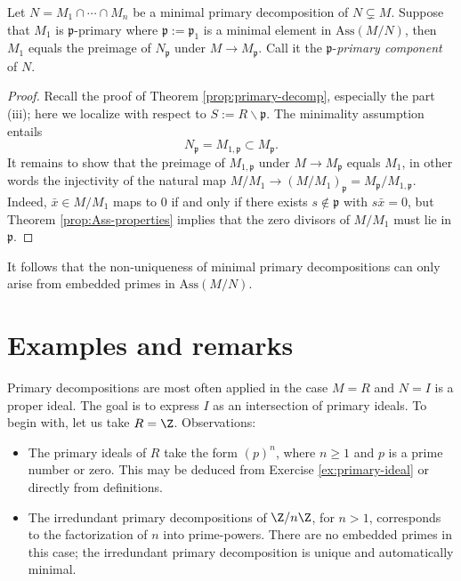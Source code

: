 \begin{corollary}\label{prop:p-primary-component}
	Let $N = M_1 \cap \cdots \cap M_n$ be a minimal primary decomposition of $N \subsetneq M$. Suppose that $M_1$ is $\mathfrak{p}$-primary where $\mathfrak{p} := \mathfrak{p}_1$ is a minimal element in $\mathrm{Ass}(M/N)$, then $M_1$ equals the preimage of $N_{\mathfrak{p}}$ under $M \to M_{\mathfrak{p}}$. Call it the $\mathfrak{p}$-\emph{primary component} of $N$.
\end{corollary}
\begin{proof}
	Recall the proof of Theorem \ref{prop:primary-decomp}, especially the part (iii); here we localize with respect to $S := R \smallsetminus \mathfrak{p}$. The minimality assumption entails
	\[ N_{\mathfrak{p}} = M_{1, \mathfrak{p}} \subset M_{\mathfrak{p}}. \]
	It remains to show that the preimage of $M_{1, \mathfrak{p}}$ under $M \to M_{\mathfrak{p}}$ equals $M_1$, in other words the injectivity of the natural map $M/M_1 \to (M/M_1)_{\mathfrak{p}} = M_{\mathfrak{p}}/M_{1, \mathfrak{p}}$. Indeed, $\bar{x} \in M/M_1$ maps to $0$ if and only if there exists $s \notin \mathfrak{p}$ with $s\bar{x}=0$, but Theorem \ref{prop:Ass-properties} implies that the zero divisors of $M/M_1$ must lie in $\mathfrak{p}$.
\end{proof}

It follows that the non-uniqueness of minimal primary decompositions can only arise from embedded primes in $\text{Ass}(M/N)$.

\section{Examples and remarks}
Primary decompositions are most often applied in the case $M = R$ and $N = I$ is a proper ideal. The goal is to express $I$ as an intersection of primary ideals. To begin with, let us take $R = \Z$. Observations:
\begin{itemize}
	\item The primary ideals of $R$ take the form $(p)^n$, where $n \geq 1$ and $p$ is a prime number or zero. This may be deduced from Exercise \ref{ex:primary-ideal} or directly from definitions.
	\item The irredundant primary decompositions of $\Z/n\Z$, for $n > 1$, corresponds to the factorization of $n$ into prime-powers. There are no embedded primes in this case; the irredundant primary decomposition is unique and automatically minimal.
\end{itemize}

